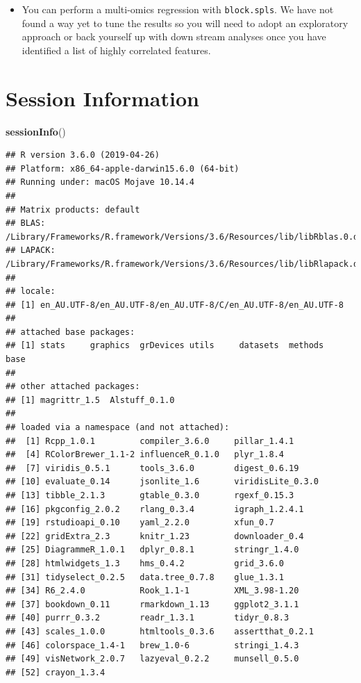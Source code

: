 \documentclass[]{book}
\newenvironment{Shaded}{\begin{snugshade}}{\end{snugshade}}
\newcommand{\KeywordTok}[1]{\textcolor[rgb]{0.13,0.29,0.53}{\textbf{#1}}}
\newcommand{\NormalTok}[1]{#1}
\providecommand{\tightlist}{%
  \setlength{\itemsep}{0pt}\setlength{\parskip}{0pt}}
\begin{document}
\begin{itemize}
  \begin{itemize}
  \tightlist
  \item
    You can perform a multi-omics regression with \texttt{block.spls}. We have not found a way yet to tune the results so you will need to adopt an exploratory approach or back yourself up with down stream analyses once you have identified a list of highly correlated features.
  \end{itemize}
\end{itemize}

\hypertarget{session-information}{%
\chapter{Session Information}\label{session-information}}

\begin{Shaded}
\begin{Highlighting}[]
\KeywordTok{sessionInfo}\NormalTok{()}
\end{Highlighting}
\end{Shaded}

\begin{verbatim}
## R version 3.6.0 (2019-04-26)
## Platform: x86_64-apple-darwin15.6.0 (64-bit)
## Running under: macOS Mojave 10.14.4
## 
## Matrix products: default
## BLAS:   /Library/Frameworks/R.framework/Versions/3.6/Resources/lib/libRblas.0.dylib
## LAPACK: /Library/Frameworks/R.framework/Versions/3.6/Resources/lib/libRlapack.dylib
## 
## locale:
## [1] en_AU.UTF-8/en_AU.UTF-8/en_AU.UTF-8/C/en_AU.UTF-8/en_AU.UTF-8
## 
## attached base packages:
## [1] stats     graphics  grDevices utils     datasets  methods   base     
## 
## other attached packages:
## [1] magrittr_1.5  Alstuff_0.1.0
## 
## loaded via a namespace (and not attached):
##  [1] Rcpp_1.0.1         compiler_3.6.0     pillar_1.4.1      
##  [4] RColorBrewer_1.1-2 influenceR_0.1.0   plyr_1.8.4        
##  [7] viridis_0.5.1      tools_3.6.0        digest_0.6.19     
## [10] evaluate_0.14      jsonlite_1.6       viridisLite_0.3.0 
## [13] tibble_2.1.3       gtable_0.3.0       rgexf_0.15.3      
## [16] pkgconfig_2.0.2    rlang_0.3.4        igraph_1.2.4.1    
## [19] rstudioapi_0.10    yaml_2.2.0         xfun_0.7          
## [22] gridExtra_2.3      knitr_1.23         downloader_0.4    
## [25] DiagrammeR_1.0.1   dplyr_0.8.1        stringr_1.4.0     
## [28] htmlwidgets_1.3    hms_0.4.2          grid_3.6.0        
## [31] tidyselect_0.2.5   data.tree_0.7.8    glue_1.3.1        
## [34] R6_2.4.0           Rook_1.1-1         XML_3.98-1.20     
## [37] bookdown_0.11      rmarkdown_1.13     ggplot2_3.1.1     
## [40] purrr_0.3.2        readr_1.3.1        tidyr_0.8.3       
## [43] scales_1.0.0       htmltools_0.3.6    assertthat_0.2.1  
## [46] colorspace_1.4-1   brew_1.0-6         stringi_1.4.3     
## [49] visNetwork_2.0.7   lazyeval_0.2.2     munsell_0.5.0     
## [52] crayon_1.3.4
\end{verbatim}


\end{document}
